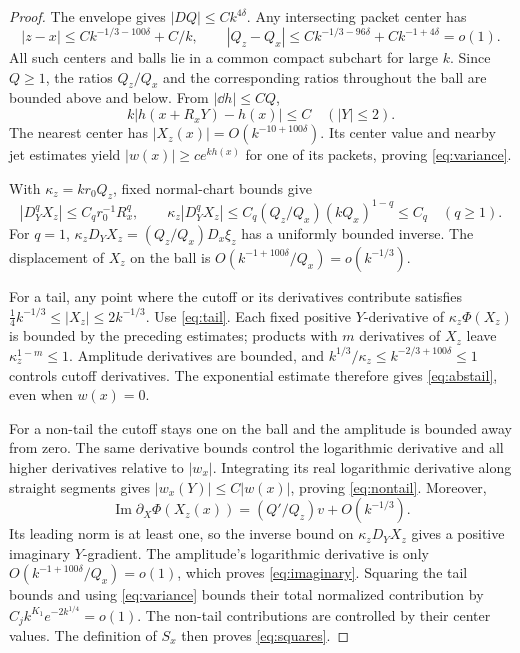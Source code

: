 \begin{proof}
The envelope gives \(|D Q|\le Ck^{4\delta}\).
Any intersecting packet center has
\[
 |z-x|\le Ck^{-1/3-100\delta}+C/k,\qquad
 |Q_z-Q_x|\le Ck^{-1/3-96\delta}+Ck^{-1+4\delta}=o(1).
\]
All such centers and balls lie in a common compact subchart for
large \(k\). Since \(Q\ge1\), the ratios \(Q_z/Q_x\) and the
corresponding ratios throughout the ball are bounded above and
below. From \(|\dd h|\le C Q\),
\[
 k|h(x+R_xY)-h(x)|\le C \quad(|Y|\le2).
\]
The nearest center has \(|X_z(x)|=O(k^{-10+100\delta})\).
Its center value and nearby jet estimates yield
\(|w(x)|\ge ce^{kh(x)}\) for one of its packets, proving
\eqref{eq:variance}.

With \(\kappa_z=kr_0Q_z\), fixed normal-chart bounds give
\[
 |D_Y^qX_z|\le C_qr_0^{-1}R_x^q,\qquad
 \kappa_z|D_Y^qX_z|\le
 C_q(Q_z/Q_x)(kQ_x)^{1-q}\le C_q\quad(q\ge1).
\]
For \(q=1\),
\(\kappa_z D_YX_z=(Q_z/Q_x)D_x\xi_z\) has a uniformly
bounded inverse. The displacement of \(X_z\) on the ball is
\(O(k^{-1+100\delta}/Q_x)=o(k^{-1/3})\).

For a tail, any point where the cutoff or its derivatives
contribute satisfies
\(\tfrac14k^{-1/3}\le|X_z|\le2k^{-1/3}\).
Use \eqref{eq:tail}. Each fixed positive \(Y\)-derivative of
\(\kappa_z\Phi(X_z)\) is bounded by the preceding estimates;
products with \(m\) derivatives of \(X_z\) leave
\(\kappa_z^{1-m}\le1\).
Amplitude derivatives are bounded, and
\(k^{1/3}/\kappa_z\le k^{-2/3+100\delta}\le1\)
controls cutoff derivatives. The exponential estimate therefore
gives \eqref{eq:abstail}, even when \(w(x)=0\).

For a non-tail the cutoff stays one on the ball and the amplitude
is bounded away from zero. The same derivative bounds control
the logarithmic derivative and all higher derivatives relative
to \(|w_x|\). Integrating its real logarithmic derivative along
straight segments gives \(|w_x(Y)|\le C|w(x)|\), proving
\eqref{eq:nontail}.
Moreover,
\[
 \operatorname{Im}\partial_X\Phi(X_z(x))
       =(Q'/Q_z)v+O(k^{-1/3}).
\]
Its leading norm is at least one, so the inverse bound on
\(\kappa_zD_YX_z\) gives a positive imaginary \(Y\)-gradient.
The amplitude's logarithmic derivative is only
\(O(k^{-1+100\delta}/Q_x)=o(1)\), which proves
\eqref{eq:imaginary}. Squaring the tail bounds and using
\eqref{eq:variance} bounds their total normalized contribution
by \(C_j k^{K_1}e^{-2k^{1/4}}=o(1)\).
The non-tail contributions are controlled by their center
values. The definition of \(S_x\) then proves \eqref{eq:squares}.
\end{proof}
